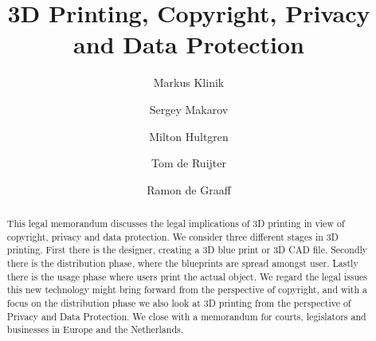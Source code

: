 \documentclass[a4paper]{article}
\begin{document}
\title{3D Printing, Copyright, Privacy and Data Protection}
\author{Markus Klinik
   \and Sergey Makarov
   \and Milton Hultgren
   \and Tom de Ruijter
   \and Ramon de Graaff}
\maketitle

\begin{abstract}
This legal memorandum discusses the legal implications of 3D printing in view of
copyright, privacy and data protection.
We consider three different stages in 3D printing.
First there is the designer, creating a 3D blue print or 3D CAD file.
Secondly there is the distribution phase, where the blueprints are spread amongst user.
Lastly there is the usage phase where users print the actual object.
We regard the legal issues this new technology might bring forward from the perspective of copyright, and with a focus on the distribution phase we also look at 3D printing from the perspective of Privacy and Data Protection.
We close with a memorandum for courts, legislators and businesses in Europe and the Netherlands.

\end{abstract}





\end{document}

